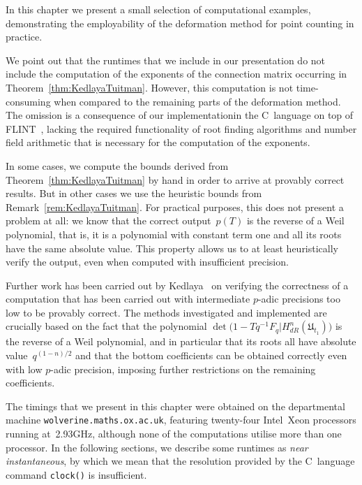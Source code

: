 
In this chapter we present a small selection of computational examples, 
demonstrating the employability of the deformation method for point counting 
in practice.

We point out that the runtimes that we include in our presentation 
do not include the computation of the exponents of the connection 
matrix occurring in Theorem~\ref{thm:KedlayaTuitman}.  However, 
this computation is not time-consuming when compared to the remaining 
parts of the deformation method.  The omission is a consequence of 
our implementation\footnotemark in the C~language on top of 
FLINT~\citep{FLINT}, lacking the required functionality of root finding 
algorithms and number field arithmetic that is necessary for the 
computation of the exponents.


In some cases, we compute the bounds derived from 
Theorem~\ref{thm:KedlayaTuitman} by hand in order to arrive at 
provably correct results.  But in other cases we use the heuristic 
bounds from Remark~\ref{rem:KedlayaTuitman}.  For practical purposes, 
this does not present a problem at all:  we know that the correct 
output~$p(T)$ is the reverse of a Weil polynomial, that is, 
it is a polynomial with constant term one and all its roots have 
the same absolute value.  This property allows us to at least 
heuristically verify the output, even when computed with insufficient 
precision.

Further work has been carried out by Kedlaya~\citep{Kedlaya2008} on 
verifying the correctness of a computation that has been carried out 
with intermediate $p$-adic precisions too low to be provably correct. 
The methods investigated and implemented are crucially based on the 
fact that the polynomial 
\mbox{$\det\bigl(1 - T q^{-1} F_q | H_{dR}^{n}(\mathfrak{U}_{t_1})\bigr)$} 
is the reverse of a Weil polynomial, and in particular that its 
roots all have absolute value~$q^{(1-n)/2}$ and that the bottom 
coefficients can be obtained correctly even with low $p$-adic precision, 
imposing further restrictions on the remaining coefficients.

The timings that we present in this chapter were obtained on the 
departmental machine {\tt{wolverine.maths.ox.ac.uk}}, featuring twenty-four 
\mbox{Intel Xeon} processors running at~2.93GHz, although none of the 
computations utilise more than one processor.  In the following sections, 
we describe some runtimes as \emph{near instantaneous}, by which we mean 
that the resolution provided by the C~language command {\tt{clock()}} is 
insufficient.

